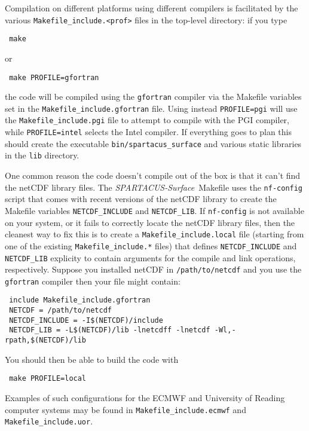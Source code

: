 \documentclass[a4,oneside]{article}
\def\codesize{\small}
\def\spsurf{\emph{SPARTACUS-Surface}}
\def\code#1{{\codesize\texttt{#1}}}
\begin{document}
Compilation on different platforms using different compilers is
facilitated by the various \code{Makefile\_include.<prof>} files in the
top-level directory: if you type
%
\begin{lstlisting}
 make
\end{lstlisting}
%
or
%
\begin{lstlisting}
 make PROFILE=gfortran
\end{lstlisting}
%
the code will be compiled using the \code{gfortran} compiler via the
Makefile variables set in the \code{Makefile\_include.gfortran}
file. Using instead \code{PROFILE=pgi} will use the
\code{Makefile\_include.pgi} file to attempt to compile with the PGI
compiler, while \code{PROFILE=intel} selects the Intel compiler.  If
everything goes to plan this should create the executable
\code{bin/spartacus\_surface} and various static libraries in the \code{lib}
directory.

One common reason the code doesn't compile out of the box is that it
can't find the netCDF library files.  The \spsurf\ Makefile uses the
\code{nf-config} script that comes with recent versions of the netCDF
library to create the Makefile variables \code{NETCDF\_INCLUDE} and
\code{NETCDF\_LIB}. If \code{nf-config} is not available on your
system, or it fails to correctly locate the netCDF library files, then
the cleanest way to fix this is to create a
\code{Makefile\_include.local} file (starting from one of the existing
\code{Makefile\_include.*} files) that defines \code{NETCDF\_INCLUDE}
and \code{NETCDF\_LIB} explicity to contain arguments for the compile
and link operations, respectively.  Suppose you installed netCDF in
\code{/path/to/netcdf} and you use the \code{gfortran} compiler then
your file might contain:
\begin{lstlisting}
 include Makefile_include.gfortran
 NETCDF = /path/to/netcdf
 NETCDF_INCLUDE = -I$(NETCDF)/include
 NETCDF_LIB = -L$(NETCDF)/lib -lnetcdff -lnetcdf -Wl,-rpath,$(NETCDF)/lib
\end{lstlisting}
You should then be able to build the code with
%
\begin{lstlisting}
 make PROFILE=local
\end{lstlisting}
%
Examples of such configurations for the ECMWF and University of
Reading computer systems may be found in
\code{Makefile\_include.ecmwf} and \code{Makefile\_include.uor}.
\end{document}
